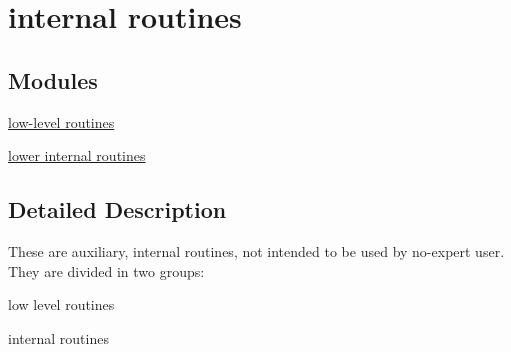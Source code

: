 \hypertarget{group__group2}{\section{internal routines}
\label{group__group2}
}
\subsection*{Modules}
\begin{DoxyCompactItemize}
\item 
\hyperlink{group__group21}{low-\/level routines}
\item 
\hyperlink{group__group22}{lower internal routines}
\end{DoxyCompactItemize}


\subsection{Detailed Description}
These are auxiliary, internal routines, not intended to be used by no-\/expert user. They are divided in two groups\-:
\begin{DoxyItemize}
\item low level routines
\item internal routines 
\end{DoxyItemize}